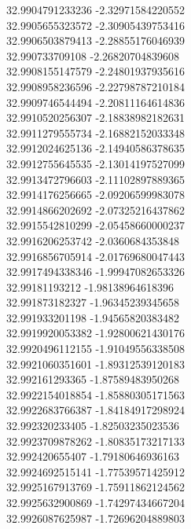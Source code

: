 {32.9904791233236	-2.32971584220552\\
32.9905655323572	-2.30905439753416\\
32.9906503879413	-2.28855176046939\\
32.990733709108	-2.26820704839608\\
32.9908155147579	-2.24801937935616\\
32.9908958236596	-2.22798787210184\\
32.9909746544494	-2.20811164614836\\
32.9910520256307	-2.18838982182631\\
32.9911279555734	-2.16882152033348\\
32.9912024625136	-2.14940586378635\\
32.9912755645535	-2.13014197527099\\
32.9913472796603	-2.11102897889365\\
32.9914176256665	-2.09206599983078\\
32.9914866202692	-2.07325216437862\\
32.9915542810299	-2.05458660000237\\
32.9916206253742	-2.0360684353848\\
32.9916856705914	-2.01769680047443\\
32.9917494338346	-1.99947082653326\\
32.99181193212	-1.98138964618396\\
32.991873182327	-1.96345239345658\\
32.991933201198	-1.94565820383482\\
32.9919920053382	-1.92800621430176\\
32.9920496112155	-1.91049556338508\\
32.9921060351601	-1.89312539120183\\
32.992161293365	-1.87589483950268\\
32.9922154018854	-1.85880305171563\\
32.9922683766387	-1.84184917298924\\
32.992320233405	-1.82503235023536\\
32.9923709878262	-1.80835173217133\\
32.992420655407	-1.79180646936163\\
32.9924692515141	-1.77539571425912\\
32.9925167913769	-1.75911862124562\\
32.9925632900869	-1.74297434667204\\
32.9926087625987	-1.72696204889803\\
}
